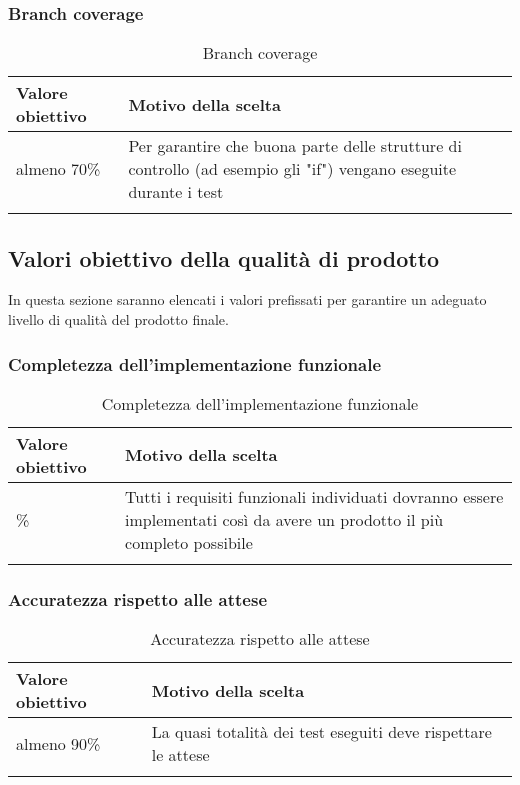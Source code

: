 \documentclass[../PianoDiQualifica_v4.0.0.tex]{subfiles}
\begin{document}
		\subsubsection{Branch coverage}
			\begin{longtable}[c] { >{\centering\arraybackslash}p{4cm} p{7cm} }
				\toprule
				\centerline{\textbf{Valore obiettivo}} & \centerline{\textbf{Motivo della scelta}} \\
				\midrule
					almeno 70\% & Per garantire che buona parte delle strutture di controllo (ad esempio gli "if") vengano eseguite durante i test \\
				\bottomrule
				\caption{Branch coverage}
			\end{longtable}


	\subsection{Valori obiettivo della qualità di prodotto}
	\label{ssec:qualitaprodotto}
		In questa sezione saranno elencati i valori prefissati per garantire un adeguato livello di qualità del prodotto finale.

		\subsubsection{Completezza dell'implementazione funzionale}
			\begin{longtable}[c] { >{\centering\arraybackslash}p{4cm} p{7cm} }
				\toprule
				\centerline{\textbf{Valore obiettivo}} & \centerline{\textbf{Motivo della scelta}} \\
				\midrule
					100\% &	Tutti i requisiti funzionali individuati dovranno essere implementati così da avere un prodotto il più completo possibile\\
				\bottomrule
				\caption{Completezza dell'implementazione funzionale}
			\end{longtable}

		\subsubsection{Accuratezza rispetto alle attese}
			\begin{longtable}[c] { >{\centering\arraybackslash}p{4cm} p{7cm} }
				\toprule
				\centerline{\textbf{Valore obiettivo}} & \centerline{\textbf{Motivo della scelta}} \\
				\midrule
					almeno 90\% & La quasi totalità dei test eseguiti deve rispettare le attese \\
				\bottomrule
				\caption{Accuratezza rispetto alle attese}
			\end{longtable}
\end{document}
